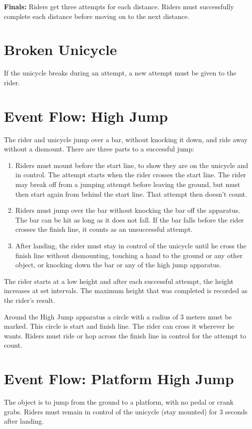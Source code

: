 \textbf{Finals:}
Riders get three attempts for each distance.
Riders must successfully complete each distance before moving on to the next distance.

\section{Broken Unicycle}
If the unicycle breaks during an attempt, a new attempt must be given to the rider.

\section{Event Flow: High Jump}
The rider and unicycle jump over a bar, without knocking it down, and ride away without a dismount.
There are three parts to a successful jump: 
\begin{enumerate}
\item Riders must mount before the start line, to show they are on the unicycle and in control.
The attempt starts when the rider crosses the start line.
The rider may break off from a jumping attempt before leaving the ground, but must then start again from behind the start line.
That attempt then doesn't count.
\item Riders must jump over the bar without knocking the bar off the apparatus.
The bar can be hit as long as it does not fall.
If the bar falls before the rider crosses the finish line, it counts as an unsuccessful attempt.
\item After landing, the rider must stay in control of the unicycle until he cross the finish line without dismounting, touching a hand to the ground or any other object, or knocking down the bar or any of the high jump apparatus.
\end{enumerate}
The rider starts at a low height and after each successful attempt, the height increases at set intervals.
The maximum height that was completed is recorded as the rider's result.

Around the High Jump apparatus a circle with a radius of 3 meters must be marked.
This circle is start and finish line.
The rider can cross it wherever he wants.
Riders must ride or hop across the finish line in control for the attempt to count.

\section{Event Flow: Platform High Jump}
The object is to jump from the ground to a platform, with no pedal or crank grabs.
Riders must remain in control of the unicycle (stay mounted) for 3 seconds after landing.

